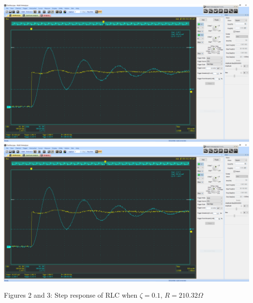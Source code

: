 \documentclass[12pt]{article}
\newcommand{\objects}[2]{%
  \leavevmode\vbox{\hbox{#1}\nointerlineskip\hbox{#2}}%
}
\begin{document}
    \begin{center}
        \objects
            {\includegraphics[width=\textwidth]{4.4 (0.1) 1.png}}
            {\includegraphics[width=\textwidth]{4.4 (0.1) 2.png}}
    \end{center}
    \begin{center}
        Figures 2 and 3: Step response of RLC when $ \zeta = 0.1 $, $ R = 210.32 \Omega $
    \end{center}
    \newpage
\end{document}
